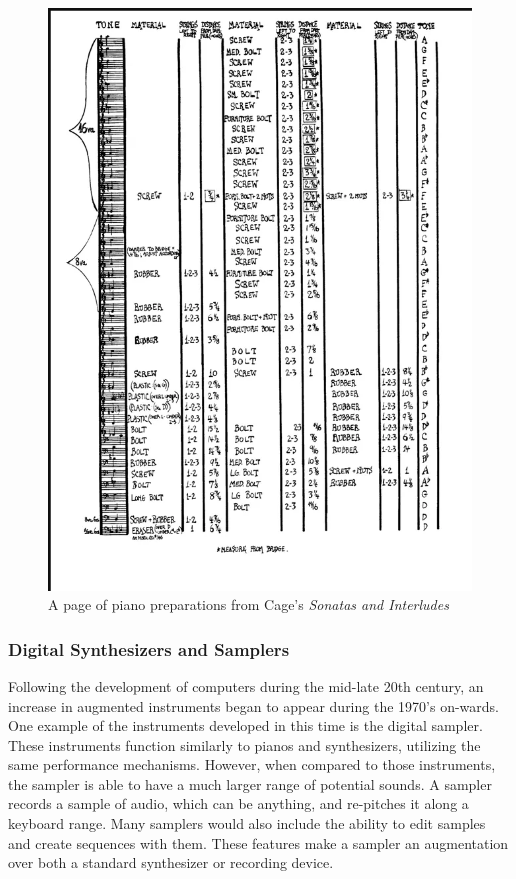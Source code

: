 \begin{figure}
    \centering
    \includegraphics[scale=0.6]{Scores/image_2023-05-08_184813894.png}
    \caption{A page of piano preparations from Cage's \textit{Sonatas and Interludes}}
    \label{fig:siPrep} %
\end{figure}

\subsubsection{Digital Synthesizers and Samplers}

Following the development of computers during the mid-late 20th century, an increase in augmented instruments began to appear during the 1970's on-wards. One example of the instruments developed in this time is the digital sampler. These instruments function similarly to pianos and synthesizers, utilizing the same performance mechanisms. However, when compared to those instruments, the sampler is able to have a much larger range of potential sounds. A sampler records a sample of audio, which can be anything, and re-pitches it along a keyboard range. Many samplers would also include the ability to edit samples and create sequences with them. These features make a sampler an augmentation over both a standard synthesizer or recording device.

